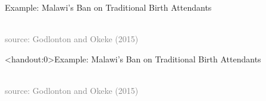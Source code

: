 \documentclass[10pt,xcolor=table,ignorenonframetext,aspectratio=169]{beamer}
\begin{document}
\begin{frame}{Example:  Malawi's Ban on Traditional Birth Attendants}

\medskip
\begin{center}
	 \\
	\textcolor{gray}{\tiny{source:  Godlonton and Okeke (2015)}}
\end{center}

\end{frame}



\begin{frame}<handout:0>{Example:  Malawi's Ban on Traditional Birth Attendants}

\medskip
\begin{center}
	 \\
	\textcolor{gray}{\tiny{source:  Godlonton and Okeke (2015)}}
\end{center}

\end{frame}


\end{document}

